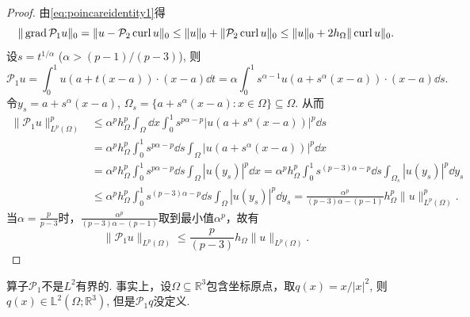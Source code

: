\begin{proof}
由\eqref{eq:poincareidentity1}得 
$$
\|\operatorname{grad}\mathcal{P}_1u\|_0=\|u -\mathcal{P}_2\operatorname{curl} u\|_0\leq \|u\|_0+\|\mathcal{P}_2\operatorname{curl} u\|_0\leq \|u\|_0+2h_{\Omega}\|\operatorname{curl} u\|_0.
$$
设$s=t^{1/\alpha}$ ($\alpha>(p-1)/(p-3)$), 则
$$
\mathcal{P}_1u = \int_0^1u(a+t(x-a))\cdot (x-a)\dd t= \alpha\int_0^1s^{\alpha-1}u(a+s^{\alpha}(x-a))\cdot (x-a)\dd s.
$$
令$y_s=a+s^{\alpha}(x-a)$, $\Omega_s=\{a+s^{\alpha}(x-a): x\in\Omega\}\subseteq\Omega$.
从而
\begin{align*}
\|\mathcal{P}_1u\|_{L^p(\Omega)}^p&\leq\alpha^ph_{\Omega}^p\int_{\Omega}\dd x\int_0^1s^{p\alpha-p}|u(a+s^{\alpha}(x-a))|^p\dd s \\
&= \alpha^ph_{\Omega}^p\int_0^1s^{p\alpha-p}\dd s\int_{\Omega}|u(a+s^{\alpha}(x-a))|^p\dd x \\
&= \alpha^ph_{\Omega}^p\int_0^1s^{p\alpha-p}\dd s\int_{\Omega}|u(y_s)|^p\dd x= \alpha^ph_{\Omega}^p\int_0^1s^{(p-3)\alpha-p}\dd s\int_{\Omega_s}|u(y_s)|^p\dd y_s \\
&\leq \alpha^ph_{\Omega}^p\int_0^1s^{(p-3)\alpha-p}\dd s\int_{\Omega}|u(y_s)|^p\dd y_s=\frac{\alpha^p}{(p-3)\alpha-(p-1)}h_{\Omega}^p\|u\|_{L^p(\Omega)}^p.
\end{align*}
当$\alpha=\frac{p}{p-3}$时，$\frac{\alpha^p}{(p-3)\alpha-(p-1)}$取到最小值$\alpha^p$，故有
$$
\|\mathcal{P}_1u\|_{L^p(\Omega)}\leq \frac{p}{(p-3)}h_{\Omega}\|u\|_{L^p(\Omega)}.
$$
\end{proof}

\begin{remark}
算子$\mathcal{P}_1$不是$L^2$有界的. 事实上，设$\Omega\subseteq\mathbb R^3$包含坐标原点，取$q(x)=x/|x|^2$, 则$q(x)\in\mathbb L^2(\Omega;\mathbb R^3)$, 但是$\mathcal{P}_1q$没定义.
\end{remark}

